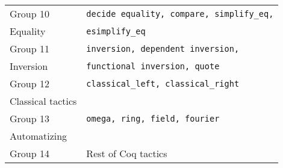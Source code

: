 \begin{table}[h]
{\begin{tabular}{l||l}
\hline
Group 10 &  \lstinline?decide equality, compare, simplify_eq,?\\
Equality & \lstinline?esimplify_eq?\\
\hline
Group 11 &  \lstinline?inversion, dependent inversion,?\\
Inversion & \lstinline?functional inversion, quote?\\
\hline
Group 12 & \lstinline?classical_left, classical_right?\\
Classical tactics & \lstinline??\\
\hline
Group 13 & \lstinline?omega, ring, field, fourier?\\
Automatizing & \\
\hline
Group 14 & Rest of Coq tactics\\
\hline
\end{tabular}}
\end{table}




